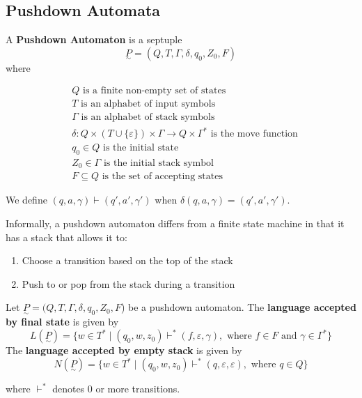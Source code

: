 \subsection{Pushdown Automata}\label{subsec:pushdown-automata}
\begin{definition}
    A \textbf{Pushdown Automaton} is a septuple \[\underset{\sim}{P}=\left(Q, T, \Gamma, \delta, q_0, Z_0, F\right)\] where

    \begin{align*}
        &Q \text{ is a finite non-empty set of states}\\
        &T \text{ is an alphabet of input symbols}\\
        &\Gamma \text{ is an alphabet of stack symbols}\\
        &\delta: Q\times (T\cup \{\varepsilon \})\times\Gamma\to Q\times \Gamma^* \text{ is the move function}\\
        &q_0\in Q \text{ is the initial state}\\
        &Z_0\in\Gamma \text{ is the initial stack symbol}\\
        &F\subseteq Q\text{ is the set of accepting states}
    \end{align*}

    We define \((q, a, \gamma)\vdash(q', a', \gamma')\) when \(\delta(q, a, \gamma)=(q', a', \gamma')\).
\end{definition}

Informally, a pushdown automaton differs from a finite state machine in that it has a stack that allows it to: 

\begin{enumerate}[1.]
    \item Choose a transition based on the top of the stack
    \item Push to or pop from the stack during a transition
\end{enumerate}

\begin{definition}
    Let \(\underset{\sim}{P}=(Q, T, \Gamma, \delta, q_0, Z_0, F\)) be a pushdown automaton. The \textbf{language accepted by final state} is given by \[L(\underset{\sim}{P})=\{w\in T^*\mid (q_0, w, z_0) \vdash^* (f, \varepsilon, \gamma), \text{ where } f\in F \text{ and } \gamma\in\Gamma^*\} \]
    The \textbf{language accepted by empty stack} is given by 
    \[N(\underset{\sim}{P})=\{w\in T^*\mid (q_0, w, z_0) \vdash^* (q, \varepsilon, \varepsilon), \text{ where } q\in Q\} \]

    where \(\vdash^*\) denotes 0 or more transitions. 
\end{definition}

